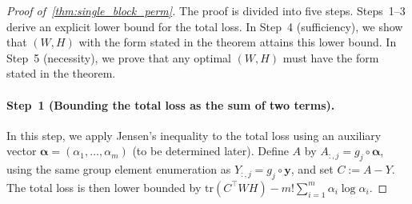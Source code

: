 \documentclass[11pt]{article}
\begin{document}
\begin{proof}[Proof of~\cref{thm:single_block_perm}]
The proof is divided into five steps. Steps~1--3 derive an explicit lower bound for the total loss. In Step~4 (sufficiency), we show that \((W,H)\) with the form stated in the theorem attains this lower bound. In Step~5 (necessity), we prove that any optimal \((W,H)\) must have the form stated in the theorem.

\paragraph{Step~1 (Bounding the total loss as the sum of two terms).}
In this step, we apply Jensen's inequality to the total loss using an auxiliary vector \(\boldsymbol{\alpha}=(\alpha_1,\ldots,\alpha_m)\) (to be determined later). Define \(A\) by \(A_{:,j}=g_j\circ\boldsymbol{\alpha}\), using the same group element enumeration as \(Y_{:,j}=g_j\circ\boldsymbol{y}\), and set \(C:=A-Y\). The total loss is then lower bounded by $\mathrm{tr}(C^\top WH)-m!\sum_{i=1}^m \alpha_i\log \alpha_i$.


\end{proof}
\end{document}
